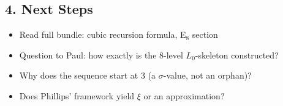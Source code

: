 \subsection*{4. Next Steps}

\begin{itemize}
\item Read full bundle: cubic recursion formula, E$_8$ section
\item Question to Paul: how exactly is the 8-level $L_0$-skeleton constructed?
\item Why does the sequence start at $3$ (a $\sigma$-value, not an orphan)?
\item Does Phillips' framework yield $\xi$ or an approximation?
\end{itemize}
